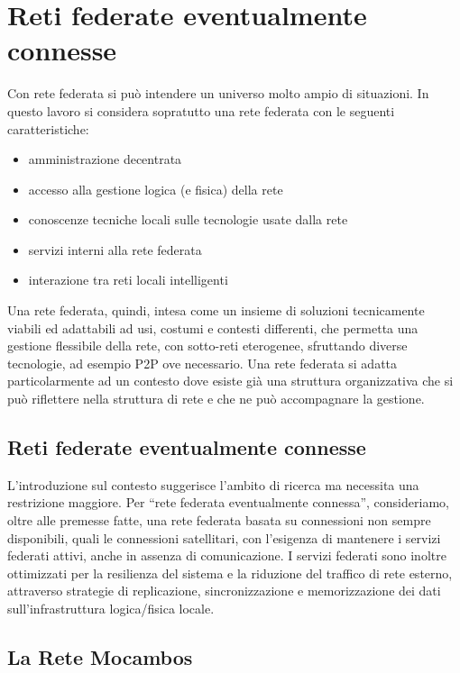 
\chapter{Reti federate eventualmente connesse}
\label{Capitolo2}

Con rete federata si può intendere un universo molto ampio di
situazioni. In questo lavoro si considera sopratutto una rete federata
con le seguenti caratteristiche:

\begin{itemize}
  \item amministrazione decentrata 
  \item accesso alla gestione logica (e fisica) della rete
  \item conoscenze tecniche locali sulle tecnologie usate dalla rete
  \item servizi interni alla rete federata
  \item interazione tra reti locali intelligenti
\end{itemize} 

Una rete federata, quindi, intesa come un insieme di soluzioni
tecnicamente viabili ed adattabili ad usi, costumi e contesti
differenti, che permetta una gestione flessibile della rete, con
sotto-reti eterogenee, sfruttando diverse tecnologie, ad esempio P2P
ove necessario. Una rete federata si adatta particolarmente ad un
contesto dove esiste già una struttura organizzativa che si può
riflettere nella struttura di rete e che ne può accompagnare la
gestione.

\section{Reti federate eventualmente connesse}
L'introduzione sul contesto suggerisce l'ambito di ricerca ma
necessita una restrizione maggiore. Per ``rete federata eventualmente
connessa'', consideriamo, oltre alle premesse fatte, una rete federata
basata su connessioni non sempre disponibili, quali le connessioni
satellitari, con l'esigenza di mantenere i servizi federati attivi,
anche in assenza di comunicazione. I servizi federati sono inoltre
ottimizzati per la resilienza del sistema e la riduzione del traffico
di rete esterno, attraverso strategie di replicazione, sincronizzazione
e memorizzazione dei dati sull'infrastruttura logica/fisica locale.

\section{La Rete Mocambos}
\label{sec:ReteMocambos}

